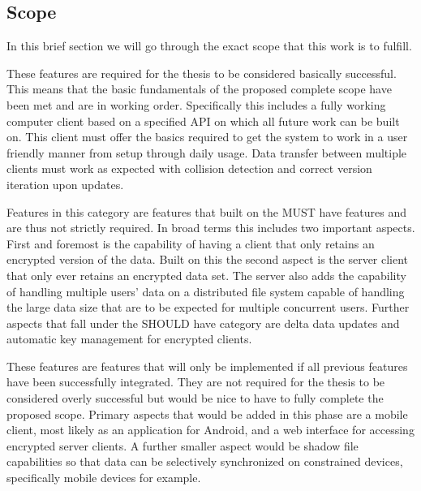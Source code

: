 \subsection{Scope}

In this brief section we will go through the exact scope that this work is to fulfill.

\begin{description}[leftmargin=2em,style=nextline,noitemsep,nolistsep]
\item[MUST have]
    These features are required for the thesis to be considered basically successful.
    This means that the basic fundamentals of the proposed complete scope have been met and are in working order.
    Specifically this includes a fully working computer client based on a specified API on which all future work can be built on.
    This client must offer the basics required to get the system to work in a user friendly manner from setup through daily usage.
    Data transfer between multiple clients must work as expected with collision detection and correct version iteration upon updates.
\item[SHOULD have]
    Features in this category are features that built on the MUST have features and are thus not strictly required.
    In broad terms this includes two important aspects.
    First and foremost is the capability of having a client that only retains an encrypted version of the data.
    Built on this the second aspect is the server client that only ever retains an encrypted data set.
    The server also adds the capability of handling multiple users' data on a distributed file system capable of handling the large data size that are to be expected for multiple concurrent users.
    Further aspects that fall under the SHOULD have category are delta data updates and automatic key management for encrypted clients.
\item[COULD have]
    These features are features that will only be implemented if all previous features have been successfully integrated.
    They are not required for the thesis to be considered overly successful but would be nice to have to fully complete the proposed scope.
    Primary aspects that would be added in this phase are a mobile client, most likely as an application for Android, and a web interface for accessing encrypted server clients.
    A further smaller aspect would be shadow file capabilities so that data can be selectively synchronized on constrained devices, specifically mobile devices for example.
\end{description}


